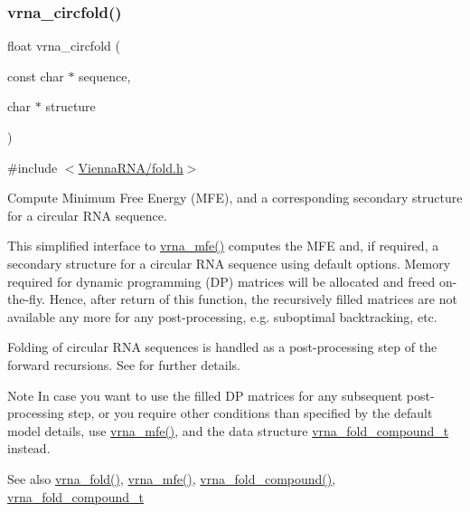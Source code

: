 \subsubsection{\texorpdfstring{vrna\+\_\+circfold()}{vrna\_circfold()}}
{\footnotesize\ttfamily float vrna\+\_\+circfold (\begin{DoxyParamCaption}\item[{const char $\ast$}]{sequence,  }\item[{char $\ast$}]{structure }\end{DoxyParamCaption})}



{\ttfamily \#include $<$\hyperlink{fold_8h}{Vienna\+R\+N\+A/fold.\+h}$>$}



Compute Minimum Free Energy (M\+FE), and a corresponding secondary structure for a circular R\+NA sequence. 

This simplified interface to \hyperlink{group__mfe__fold_gabd3b147371ccf25c577f88bbbaf159fd}{vrna\+\_\+mfe()} computes the M\+FE and, if required, a secondary structure for a circular R\+NA sequence using default options. Memory required for dynamic programming (DP) matrices will be allocated and free\textquotesingle{}d on-\/the-\/fly. Hence, after return of this function, the recursively filled matrices are not available any more for any post-\/processing, e.\+g. suboptimal backtracking, etc.

Folding of circular R\+NA sequences is handled as a post-\/processing step of the forward recursions. See \cite{hofacker:2006} for further details.

\begin{DoxyNote}{Note}
In case you want to use the filled DP matrices for any subsequent post-\/processing step, or you require other conditions than specified by the default model details, use \hyperlink{group__mfe__fold_gabd3b147371ccf25c577f88bbbaf159fd}{vrna\+\_\+mfe()}, and the data structure \hyperlink{group__fold__compound_ga1b0cef17fd40466cef5968eaeeff6166}{vrna\+\_\+fold\+\_\+compound\+\_\+t} instead.
\end{DoxyNote}
\begin{DoxySeeAlso}{See also}
\hyperlink{group__mfe__fold__single_ga29a33b2895f4e67b0480271ff289afdc}{vrna\+\_\+fold()}, \hyperlink{group__mfe__fold_gabd3b147371ccf25c577f88bbbaf159fd}{vrna\+\_\+mfe()}, \hyperlink{group__fold__compound_ga6601d994ba32b11511b36f68b08403be}{vrna\+\_\+fold\+\_\+compound()}, \hyperlink{group__fold__compound_ga1b0cef17fd40466cef5968eaeeff6166}{vrna\+\_\+fold\+\_\+compound\+\_\+t}
\end{DoxySeeAlso}

